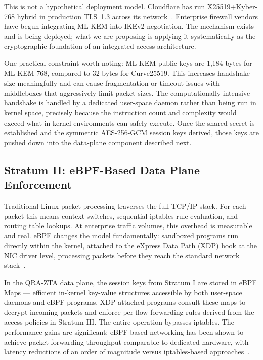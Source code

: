 \documentclass[conference]{IEEEtran}
\begin{document}
This is not a hypothetical deployment model. Cloudflare has
run X25519+Kyber-768 hybrid in production TLS~1.3 across
its network~\cite{cloudflare_pqc}. Enterprise firewall vendors
have begun integrating ML-KEM into IKEv2 negotiation. The
mechanism exists and is being deployed; what we are proposing
is applying it systematically as the cryptographic foundation
of an integrated access architecture.

One practical constraint worth noting: ML-KEM public keys are
1,184 bytes for ML-KEM-768, compared to 32 bytes for Curve25519.
This increases handshake size meaningfully and can cause
fragmentation or timeout issues with middleboxes that
aggressively limit packet sizes. The computationally intensive
handshake is handled by a dedicated user-space daemon rather
than being run in kernel space, precisely because the instruction
count and complexity would exceed what in-kernel environments
can safely execute. Once the shared secret is established and
the symmetric AES-256-GCM session keys derived, those keys are
pushed down into the data-plane component described next.

\subsection{Stratum II: eBPF-Based Data Plane Enforcement}

Traditional Linux packet processing traverses the full TCP/IP
stack. For each packet this means context switches, sequential
iptables rule evaluation, and routing table lookups. At
enterprise traffic volumes, this overhead is measurable and
real. eBPF changes the model fundamentally: sandboxed programs
run directly within the kernel, attached to the eXpress Data
Path (XDP) hook at the NIC driver level, processing packets
before they reach the standard network stack~\cite{ebpf_networking}.

In the QRA-ZTA data plane, the session keys from Stratum I
are stored in eBPF Maps --- efficient in-kernel key-value
structures accessible by both user-space daemons and eBPF
programs. XDP-attached programs consult these maps to decrypt
incoming packets and enforce per-flow forwarding rules derived
from the access policies in Stratum III. The entire operation
bypasses iptables. The performance gains are significant:
eBPF-based networking has been shown to achieve packet
forwarding throughput comparable to dedicated hardware, with
latency reductions of an order of magnitude versus
iptables-based approaches~\cite{ebpf_networking}.
\end{document}
